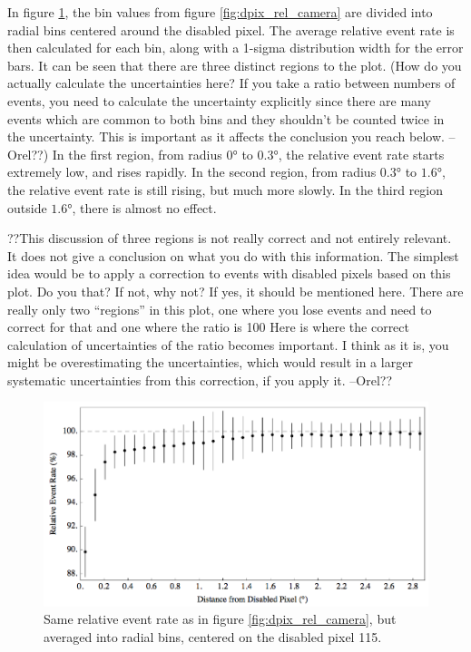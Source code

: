     In figure \ref{fig:dpix_rel_radial}, the bin values from figure \ref{fig:dpix_rel_camera} are divided into radial bins centered around the disabled pixel.
    The average relative event rate is then calculated for each bin, along with a 1-sigma distribution width for the error bars.
    It can be seen that there are three distinct regions to the plot.
    (How do you actually calculate the uncertainties here? If you take a ratio between numbers of events, you need to calculate the uncertainty explicitly since there are many events which are common to both bins and they shouldn’t be counted twice in the uncertainty.  This is important as it affects the conclusion you reach below. --Orel??)
    In the first region, from radius $\ang{0}$ to $\ang{0.3}$, the relative event rate starts extremely low, and rises rapidly.
    In the second region, from radius $\ang{0.3}$ to $\ang{1.6}$, the relative event rate is still rising, but much more slowly.
    In the third region outside $\ang{1.6}$, there is almost no effect.

    ??This discussion of three regions is not really correct and not entirely relevant.
    It does not give a conclusion on what you do with this information.
    The simplest idea would be to apply a correction to events with disabled pixels based on this plot. Do you that? If not, why not? If yes, it should be mentioned here.
    There are really only two “regions” in this plot, one where you lose events and need to correct for that and one where the ratio is 100%
    Here is where the correct calculation of uncertainties of the ratio becomes important.
    I think as it is, you might be overestimating the uncertainties, which would result in a larger systematic uncertainties from this correction, if you apply it. --Orel??


    \begin{figure}[ht]
      \begin{center}
        \includegraphics[width=\textwidth]{images/disabled_pixel/relativerate_radial}
        \caption[Radial Relative Event Rate]{Same relative event rate as in figure \ref{fig:dpix_rel_camera}, but averaged into radial bins, centered on the disabled pixel 115. }\label{fig:dpix_rel_radial}
      \end{center}
    \end{figure}

